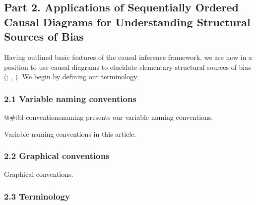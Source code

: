 \documentclass[
  singlecolumn]{article}
\begin{document}
\subsection{Part 2. Applications of Sequentially Ordered Causal Diagrams
for Understanding Structural Sources of
Bias}\label{part-2.-applications-of-sequentially-ordered-causal-diagrams-for-understanding-structural-sources-of-bias}

Having outlined basic features of the causal inference framework, we are
now in a position to use causal diagrams to elucidate elementary
structural sources of bias (; ,
). We begin by defining our terminology.

\subsubsection{2.1 Variable naming
conventions}\label{variable-naming-conventions}

@\#tbl-conventionsnaming presents our variable naming conventions.

\begin{table}

\caption{\label{tbl-conventionsnaming}Variable naming conventions in
this article.}

\centering{

\terminologylocalconventions 

}

\end{table}%

\subsubsection{2.2 Graphical conventions}\label{graphical-conventions}

\begin{table}

\caption{\label{tbl-conventionsgraph}Graphical conventions.}

\centering{

\terminologylocalconventions 

}

\end{table}%

\subsubsection{2.3 Terminology}\label{terminology}
\end{document}
